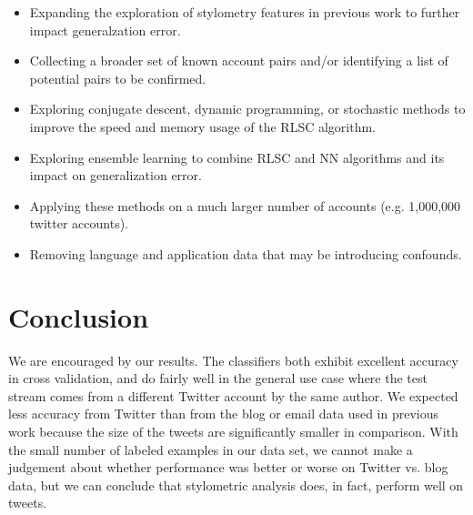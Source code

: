 \documentclass[10pt, conference, compsocconf]{IEEEtran}
\begin{document}
\begin{itemize}
\item Expanding the exploration of stylometry features in previous work to further impact generalzation error.
\item Collecting a broader set of known account pairs and/or identifying a list of potential pairs to be confirmed.
\item Exploring conjugate descent, dynamic programming,  or stochastic methods to improve the speed and memory usage of the RLSC algorithm.
\item Exploring ensemble learning to combine RLSC and NN algorithms and its impact on generalization error.
\item Applying these methods on a much larger number of accounts (e.g. 1,000,000 twitter accounts).
\item Removing language and application data that may be introducing confounds.
\end{itemize}

\section{Conclusion}

We are encouraged by our results. The classifiers both exhibit
excellent accuracy in cross validation, and do fairly well in the
general use case where the test stream comes from a different Twitter
account by the same author. We expected less accuracy from Twitter
than from the blog or email data used in previous work because the
size of the tweets are significantly smaller in comparison. With the
small number of labeled examples in our data set, we cannot make a
judgement about whether performance was better or worse on Twitter
vs. blog data, but we can conclude that stylometric analysis does, in
fact, perform well on tweets.

%
%
\end{document}

